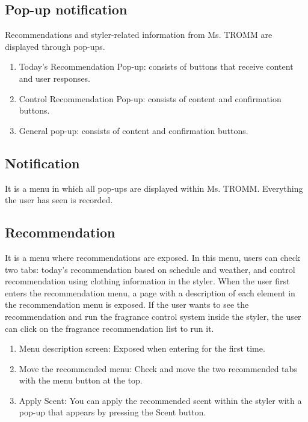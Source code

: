 \documentclass[conference]{IEEEtran}
\begin{document}
\subsection{Pop-up notification}
Recommendations and styler-related information from Ms. TROMM are displayed through pop-ups.\\
\begin{enumerate}
    \item Today's Recommendation Pop-up: consists of buttons that receive content and user responses.\\
    \item Control Recommendation Pop-up: consists of content and confirmation buttons.\\
    \item General pop-up: consists of content and confirmation buttons.\\
\end{enumerate}

\subsection{Notification}
It is a menu in which all pop-ups are displayed within Ms. TROMM. Everything the user has seen is recorded.\\

\subsection{Recommendation}
It is a menu where recommendations are exposed. In this menu, users can check two tabs: today's recommendation based on schedule and weather, and control recommendation using clothing information in the styler. When the user first enters the recommendation menu, a page with a description of each element in the recommendation menu is exposed. If the user wants to see the recommendation and run the fragrance control system inside the styler, the user can click on the fragrance recommendation list to run it.\\
\begin{enumerate}
    \item Menu description screen: Exposed when entering for the first time.\\
    \item Move the recommended menu: Check and move the two recommended tabs with the menu button at the top.\\
    \item  Apply Scent: You can apply the recommended scent within the styler with a pop-up that appears by pressing the Scent button.\\
\end{enumerate}
\end{document}
